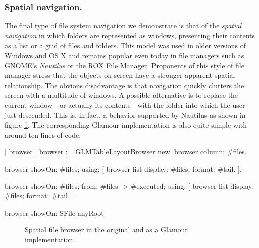 \documentclass[a4paper,10pt,twoside]{book}
\begin{document}
\subsubsection{Spatial navigation.} The final type of file system
navigation we demonstrate is that of the \emph{spatial navigation} in
which folders are represented as windows, presenting their contents as
a list or a grid of files and folders. This model was used in older
versions of Windows and OS X and remains popular even today in file
managers such as GNOME's \emph{Nautilus} or the ROX File
Manager. Proponents of this style of file manager stress that the
objects on screen have a stronger apparent spatial relationship. The
obvious disadvantage is that navigation quickly clutters the screen
with a multitude of windows. A possible alternative is to replace the
current window---or actually its contents---with the folder into which
the user just descended. This is, in fact, a behavior supported by
Nautilus as shown in figure \ref{fig:casestudies/file_window}. The
corresponding Glamour implementation is also quite simple with around
ten lines of code. 

\begin{code}{}
| browser |
browser := GLMTableLayoutBrowser new.
browser column: #files.

browser showOn: #files; using: [
	browser list
		display: #files;
		format: #tail.
].

browser showOn: #files; from: #files -> #executed; using: [
	browser list
		display: #files;
		format: #tail.
].

browser showOn: SFile anyRoot
\end{code}

\begin{figure}[tbp]
\begin{center}
\caption{Spatial file browser in the original and as a Glamour implementation.}
\label{fig:casestudies/file_window}
\end{center}
\end{figure}
\end{document}
